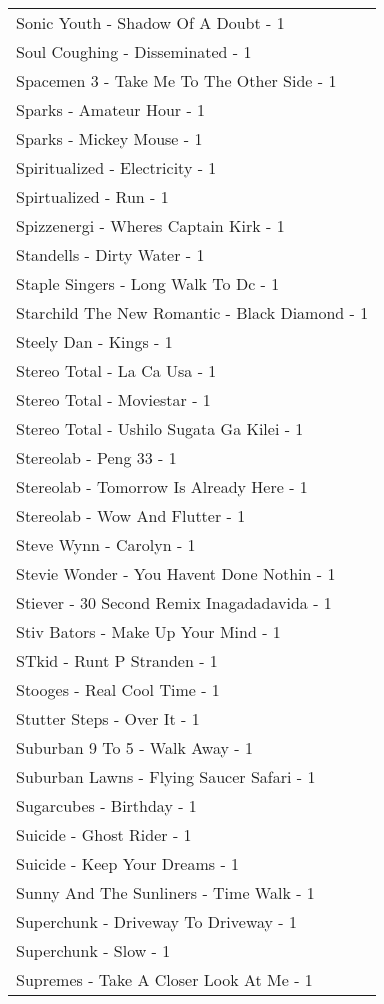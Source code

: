 \documentclass[
]{article}
\begin{document}
\begin{longtable}{l}
Sonic Youth - Shadow Of A Doubt - 1 \\ 
Soul Coughing - Disseminated - 1 \\ 
Spacemen 3 - Take Me To The Other Side - 1 \\ 
Sparks - Amateur Hour - 1 \\ 
Sparks - Mickey Mouse - 1 \\ 
Spiritualized - Electricity - 1 \\ 
Spirtualized - Run - 1 \\ 
Spizzenergi - Wheres Captain Kirk - 1 \\ 
Standells - Dirty Water - 1 \\ 
Staple Singers - Long Walk To Dc - 1 \\ 
Starchild The New Romantic - Black Diamond - 1 \\ 
Steely Dan - Kings - 1 \\ 
Stereo Total - La Ca Usa - 1 \\ 
Stereo Total - Moviestar - 1 \\ 
Stereo Total - Ushilo Sugata Ga Kilei - 1 \\ 
Stereolab - Peng 33 - 1 \\ 
Stereolab - Tomorrow Is Already Here - 1 \\ 
Stereolab - Wow And Flutter - 1 \\ 
Steve Wynn - Carolyn - 1 \\ 
Stevie Wonder - You Havent Done Nothin - 1 \\ 
Stiever - 30 Second Remix Inagadadavida - 1 \\ 
Stiv Bators - Make Up Your Mind - 1 \\ 
STkid - Runt P Stranden - 1 \\ 
Stooges - Real Cool Time - 1 \\ 
Stutter Steps - Over It - 1 \\ 
Suburban 9 To 5 - Walk Away - 1 \\ 
Suburban Lawns - Flying Saucer Safari - 1 \\ 
Sugarcubes - Birthday - 1 \\ 
Suicide - Ghost Rider - 1 \\ 
Suicide - Keep Your Dreams - 1 \\ 
Sunny And The Sunliners - Time Walk - 1 \\ 
Superchunk - Driveway To Driveway - 1 \\ 
Superchunk - Slow - 1 \\ 
Supremes - Take A Closer Look At Me - 1 \\ 

\end{longtable}
\end{document}

